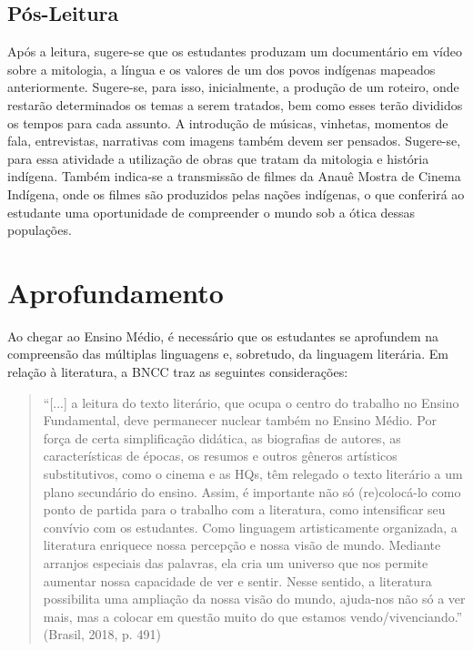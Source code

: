 \documentclass[12pt]{extarticle}
\begin{document}
\subsection{Pós-Leitura}

 Após a leitura, sugere-se que os estudantes produzam um
documentário em vídeo sobre a mitologia, a língua e os valores de um dos
povos indígenas mapeados anteriormente. Sugere-se, para isso,
inicialmente, a produção de um roteiro, onde restarão determinados os
temas a serem tratados, bem como esses terão divididos os tempos para
cada assunto. A introdução de músicas, vinhetas, momentos de fala,
entrevistas, narrativas com imagens também devem ser pensados.
Sugere-se, para essa atividade a utilização de obras que tratam da
mitologia e história indígena. Também indica-se a transmissão de filmes
da Anauê Mostra de Cinema Indígena, onde os filmes são produzidos pelas
nações indígenas, o que conferirá ao estudante uma oportunidade de
compreender o mundo sob a ótica dessas populações. 


\section{Aprofundamento}

Ao chegar ao Ensino Médio, é necessário que os estudantes se aprofundem
na compreensão das múltiplas linguagens e, sobretudo, da linguagem
literária. Em relação à literatura, a BNCC traz as seguintes
considerações:

\begin{quote}
``{[}...{]} a leitura do texto literário, que ocupa o centro do trabalho
no Ensino Fundamental, deve permanecer nuclear também no Ensino Médio.
Por força de certa simplificação didática, as biografias de autores, as
características de épocas, os resumos e outros gêneros artísticos
substitutivos, como o cinema e as HQs, têm relegado o texto literário a
um plano secundário do ensino. Assim, é importante não só (re)colocá-lo
como ponto de partida para o trabalho com a literatura, como
intensificar seu convívio com os estudantes. Como linguagem
artisticamente organizada, a literatura enriquece nossa percepção e
nossa visão de mundo. Mediante arranjos especiais das palavras, ela cria
um universo que nos permite aumentar nossa capacidade de ver e sentir.
Nesse sentido, a literatura possibilita uma ampliação da nossa visão do
mundo, ajuda-nos não só a ver mais, mas a colocar em questão muito do
que estamos vendo/vivenciando.'' (Brasil, 2018, p. 491)
\end{quote}
\end{document}

